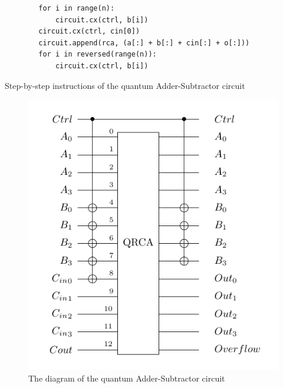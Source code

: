 \begin{listing}[!ht]
    \centering
    \begin{verbatim}
        for i in range(n):
            circuit.cx(ctrl, b[i])
        circuit.cx(ctrl, cin[0])
        circuit.append(rca, (a[:] + b[:] + cin[:] + o[:]))
        for i in reversed(range(n)):
            circuit.cx(ctrl, b[i])
    \end{verbatim}
    \caption{Step-by-step instructions of the quantum Adder-Subtractor circuit}
\end{listing}

\begin{figure}[!ht]
    \centering
    \includegraphics{images/5_Implementation/quantum_adder_subtractor.pdf}
    \caption{The diagram of the quantum Adder-Subtractor circuit}
\end{figure}